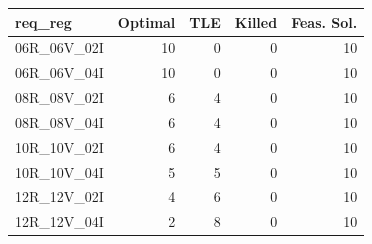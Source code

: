 
\begin{tabular}{lrrrr}
\toprule
req\_reg & Optimal & TLE & Killed & Feas. Sol.\\
\midrule
06R\_06V\_02I & 10 & 0 & 0 & 10\\
06R\_06V\_04I & 10 & 0 & 0 & 10\\
08R\_08V\_02I & 6 & 4 & 0 & 10\\
08R\_08V\_04I & 6 & 4 & 0 & 10\\
10R\_10V\_02I & 6 & 4 & 0 & 10\\
\addlinespace
10R\_10V\_04I & 5 & 5 & 0 & 10\\
12R\_12V\_02I & 4 & 6 & 0 & 10\\
12R\_12V\_04I & 2 & 8 & 0 & 10\\
\bottomrule
\end{tabular}
